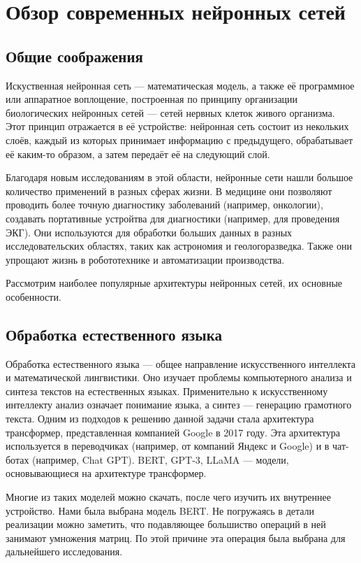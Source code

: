 \section{Обзор современных нейронных сетей}
\label{sec:Chapter2} 

\subsection{Общие соображения}

Искуственная нейронная сеть --- математическая модель, а также её программное или
аппаратное воплощение, построенная по принципу организации биологических нейронных
сетей --- сетей нервных клеток живого организма. Этот принцип отражается в её
устройстве: нейронная сеть состоит из некольких слоёв, каждый из которых принимает
информацию с предыдущего, обрабатывает её каким-то образом, а  затем передаёт её
на следующий слой.

Благодаря новым исследованиям в этой области, нейронные сети нашли большое
количество применений в разных сферах жизни. В медицине они позволяют проводить
более точную диагностику заболеваний (например, онкологии), создавать портативные
устройтва для диагностики (например, для проведения ЭКГ). Они используются
для обработки больших данных в разных исследовательских областях, таких как
астрономия и геологоразведка. Также они упрощают жизнь в робототехнике и
автоматизации производства.

Рассмотрим наиболее популярные архитектуры нейронных сетей, их основные особенности.

\subsection{Обработка естественного языка}

Обработка естественного языка --- общее направление искусственного интеллекта и
математической лингвистики. Оно изучает проблемы компьютерного анализа и синтеза
текстов на естественных языках. Применительно к искусственному интеллекту анализ
означает понимание языка, а синтез --- генерацию грамотного текста. Одним из
подходов к решению данной задачи стала архитектура трансформер, представленная
компанией Google в 2017 году. Эта архитектура используется в переводчиках
(например, от компаний Яндекс и Google) и в чат-ботах (например, Chat GPT).
BERT, GPT-3, LLaMA --- модели, основывающиеся на архитектуре трансформер.

Многие из таких моделей можно скачать, после чего изучить их внутреннее
устройство. Нами была выбрана модель BERT. Не погружаясь в детали реализации
можно заметить, что подавляющее большиство операций в ней занимают
умножения матриц. По этой причине эта операция была выбрана для
дальнейшего исследования.


